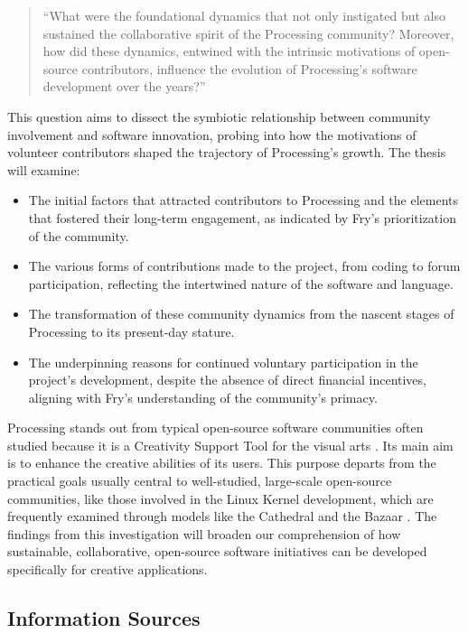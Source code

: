 \begin{quote}
  \enquote{What were the foundational dynamics that not only instigated but also sustained the collaborative spirit of the Processing community? Moreover, how did these dynamics, entwined with the intrinsic motivations of open-source contributors, influence the evolution of Processing’s software development over the years?}
\end{quote}

This question aims to dissect the symbiotic relationship between community involvement and software innovation, probing into how the motivations of volunteer contributors shaped the trajectory of Processing’s growth. The thesis will examine:

\begin{itemize}
\item The initial factors that attracted contributors to Processing and the elements that fostered their long-term engagement, as indicated by Fry’s prioritization of the community.
\item The various forms of contributions made to the project, from coding to forum participation, reflecting the intertwined nature of the software and language.
\item The transformation of these community dynamics from the nascent stages of Processing to its present-day stature.
\item The underpinning reasons for continued voluntary participation in the project’s development, despite the absence of direct financial incentives, aligning with Fry’s understanding of the community’s primacy.
\end{itemize}

Processing stands out from typical open-source software communities often studied because it is a Creativity Support Tool for the visual arts \parencite{shneidermanCreativitySupportTools2002}. Its main aim is to enhance the creative abilities of its users. This purpose departs from the practical goals usually central to well-studied, large-scale open-source communities, like those involved in the Linux Kernel development, which are frequently examined through models like the Cathedral and the Bazaar \parencite{raymondCathedralBazaarMusings2002}.
The findings from this investigation will broaden our comprehension of how sustainable, collaborative, open-source software initiatives can be developed specifically for creative applications.

\subsection{Information Sources}

